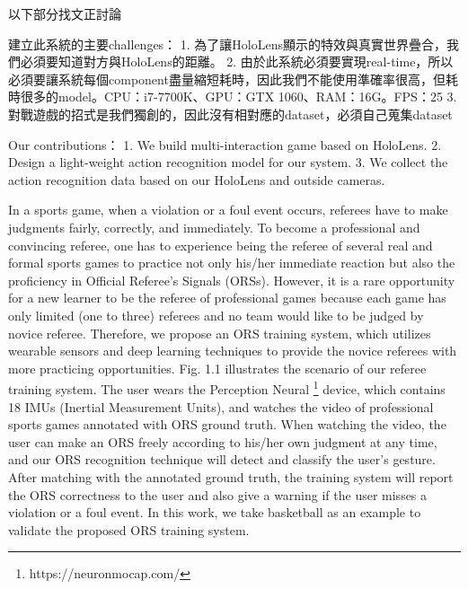 以下部分找文正討論

建立此系統的主要challenges：
1. 為了讓HoloLens顯示的特效與真實世界疊合，我們必須要知道對方與HoloLens的距離。
2. 由於此系統必須要實現real-time，所以必須要讓系統每個component盡量縮短耗時，因此我們不能使用準確率很高，但耗時很多的model。CPU：i7-7700K、GPU：GTX 1060、RAM：16G。FPS：25
3. 對戰遊戲的招式是我們獨創的，因此沒有相對應的dataset，必須自己蒐集dataset

Our contributions：
1. We build multi-interaction game based on HoloLens.
2. Design a light-weight action recognition model for our system.
3. We collect the action recognition data based on our HoloLens and outside cameras.

\newpage

In a sports game, when a violation or a foul event occurs, referees have to make judgments fairly, correctly, and immediately. To become a professional and convincing referee, one has to experience being the referee of several real and formal sports games to practice not only his/her immediate reaction but also the proficiency in Official Referee's Signals (ORSs). However, it is a rare opportunity for a new learner to be the referee of professional games because each game has only limited (one to three) referees and no team would like to be judged by novice referee. Therefore, we propose an ORS training system, which utilizes wearable sensors and deep learning techniques to provide the novice referees with more practicing opportunities. Fig. 1.1 illustrates the scenario of our referee training system. The user wears the Perception Neural \footnote{https://neuronmocap.com/} device, which contains 18 IMUs (Inertial Measurement Units), and watches the video of professional sports games annotated with ORS ground truth. When watching the video, the user can make an ORS freely according to his/her own judgment at any time, and our ORS recognition technique will detect and classify the user's gesture. After matching with the annotated ground truth, the training system will report the ORS correctness to the user and also give a warning if the user misses a violation or a foul event. In this work, we take basketball as an example to validate the proposed ORS training system.

\EndChapter
